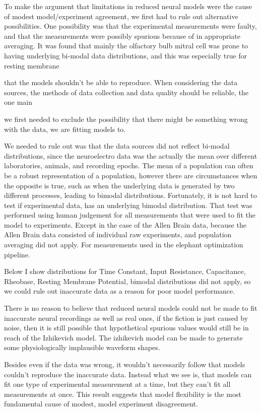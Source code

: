 To make the argument that limitations in reduced neural models were the cause of modest model/experiment agreement, we first had to rule out alternative possibilities. One possibility was that the experimental measurements were faulty, and that the measurements were possibly spurious because of in appropriate averaging. It was found that mainly the olfactory bulb mitral cell was prone to having underlying bi-modal data distributions, and this was especially true for resting membrane

that the models shouldn't be able to reproduce. When considering the data sources, the methods of data collection and data quality should be reliable, the one main 

we first needed to exclude the possibility that there might be something wrong with the data, we are fitting models to.

We needed to rule out was that the data sources did not reflect bi-modal distributions, since the neuroelectro data was the actually the mean over different laboratories, animals, and recording epochs. The mean of a population can often be a robust representation of a population, however there are circumstances when the opposite is true, such as when the underlying data is generated by two different processes, leading to bimodal distributions. Fortunately, it is not hard to test if experimental data, has an underlying bimodal distribution. That test was performed using human judgement for all measurements that were used to fit the model to experiments. Except in the case of the Allen Brain data, because the Allen Brain data consisted of individual raw experiments, and population averaging did not apply. For measurements used in the elephant optimization pipeline.

Below I show distributions for  Time Constant, Input Resistance, Capacitance, Rheobase, Resting Membrane Potential, bimodal distributions did not apply, so we could rule out inaccurate data as a reason for poor model performance.

There is no reason to believe that reduced neural models could not be made to fit inaccurate neural recordings as well as real ones, if the fiction is just caused by noise, then it is still possible that hypothetical spurious values would still be in reach of the Izhikevich model. The izhikevich model can be made to generate some physiologically implausible waveform shapes. 

Besides even if the data was wrong, it wouldn't necessarily follow that models couldn't reproduce the inaccurate data. Instead what we see is, that models can fit one type of experimental measurement at a time, but they can't fit all measurements at once. This result suggests that model flexibility is the most fundamental cause of modest, model experiment disagreement.


